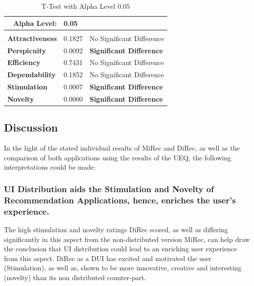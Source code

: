 \begin{table}[!htbp]
\centering
\tiny
\begin{tabular}{|l|l|l|}
\hline
\multicolumn{1}{|r|}{Alpha Level:} & 0.05   &                                                         \\ \hline
                                   &        &                                                         \\ \hline
\textbf{Attractiveness}            & 0.1827 & No Significant Difference       \\ \hline
\textbf{Perspicuity}               & 0.0092 & \textbf{Significant Difference} \\ \hline
\textbf{Efficiency}                & 0.7431 & No Significant Difference       \\ \hline
\textbf{Dependability}             & 0.1852 & No Significant Difference       \\ \hline
\textbf{Stimulation}               & 0.0007 & \textbf{Significant Difference} \\ \hline
\textbf{Novelty}                   & 0.0000 & \textbf{Significant Difference} \\ \hline
\end{tabular}
\caption{T-Test with Alpha Level 0.05}
\label{table:table53}
\end{table} 

\subsection{Discussion}
In the light of the stated individual results of MiRec and DiRec, as well as the
comparison of both applications using the results of the UEQ, the following
interpretations could be made:
\subsubsection{UI Distribution aids the Stimulation and Novelty of Recommendation
Applications, hence, enriches the user's experience.} The high stimulation and
novelty ratings DiRec scored, as well as differing significantly in this aspect
from the non-distributed version MiRec, can help draw the conclusion that UI
distribution could lead to an enriching user experience from this aspect.
DiRec as a DUI has excited and motivated the user (Stimulation), as well as,
shown to be more innovative, creative and interesting (novelty) than its non
distributed counter-part.
 

